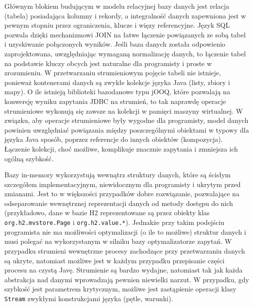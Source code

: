 \documentclass[12pt]{extarticle}
\begin{document}
    Głównym blokiem budującym w modelu relacyjnej bazy danych jest relacja (tabela) posiadająca kolumny i rekordy, a integralność danych zapewniona jest w pewnym stopniu przez ograniczenia, klucze i więzy referencyjne. Język SQL pozwala dzięki mechanizmowi JOIN na łatwe łączenie powiązanych ze sobą tabel i uzyskiwanie połączonych wyników. Jeśli baza danych została odpowienio zaprojektowana, uwzględniając wymaganą normalizację danych, to łączenie tabel na podstawie kluczy obcych jest naturalne dla programisty i proste w zrozumieniu. W przetwarzaniu strumieniowym pojęcie tabeli nie istnieje, ponieważ kontenerami danych są zwykłe kolekcje języka Java (listy, zbiory i mapy). O ile istnieją biblioteki bazodanowe typu jOOQ, które pozwalają na konwersję wyniku zapytania JDBC na strumień, to tak naprawdę operacje strumieniowe wykonują się zawsze na kolekcji w pamięci maszyny wirtualnej. W związku, aby operacje strumieniowe były wygodne dla programisty, model danych powinien uwzględniać powiązania między poszczególnymi obiektami w typowy dla języka Java sposób, poprzez referencje do innych obiektów (kompozycja). Łączenie kolekcji, choć możliwe, komplikuje znacznie zapytania i zmniejsza ich ogólną szybkość.

    Bazy in-memory wykorzystują wewnątrz struktury danych, które są ścisłym szczegółem implementacyjnym, niewidocznym dla programisty i ukrytym przed zmianami. Jest to w większości przypadków dobre rozwiązanie, pozwalające na odseparowanie wewnętrznej reprezentacji danych od metody dostępu do nich (przykładowo, dane w bazie H2 reprezentowane są przez obiekty klas \texttt{org.h2.mvstore.Page} i \texttt{org.h2.value.*}). Jednakże przy takim podejściu programista nie ma możliwości optymalizacji (o ile to możliwe) struktur danych i musi polegać na wykorzystanym w silniku bazy optymalizatorze zapytań. W przypadku strumieni wewnętrzne procesy zachodzące przy przetwarzaniu danych są ukryte, natomiast możliwe jest w każdym przypadku przepisanie części procesu na czystą Javę. Strumienie są bardzo wydajne, natomiast tak jak każda abstrakcja nad danymi wprowadzają pewnien niewielki narzut. W przypadku, gdy szybkość jest parametrem krytycznym, możliwe jest zastąpienie operacji klasy \texttt{Stream} zwykłymi konstrukcjami języka (pętle, warunki). 
\end{document}
